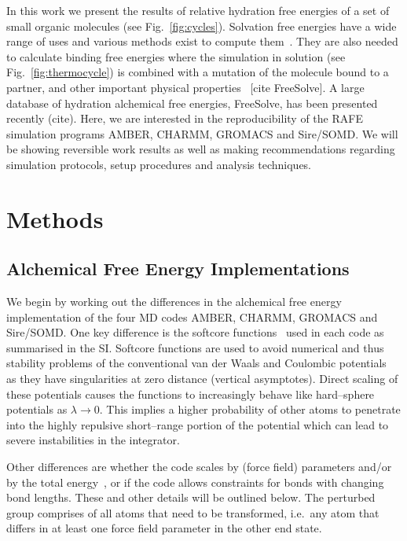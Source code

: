 \documentclass[journal=jctcce,manuscript=article]{achemso}
\begin{document}
In this work we present the results of relative hydration free
energies of a set of small organic molecules (see
Fig.~\ref{fig:cycles}).  Solvation free energies have a wide range of
uses and various methods exist to compute
them~\cite{Skyner:2015:PCCP}.  They are also needed to calculate
binding free energies where the simulation in solution (see
Fig.~\ref{fig:thermocycle}) is combined with a mutation of the
molecule bound to a partner, and other important physical
properties~\cite{Skyner:2015:PCCP} [cite FreeSolve].  A large database
of hydration alchemical free energies, FreeSolve, has been presented
recently (cite). Here, we are interested in the reproducibility of the
RAFE simulation programs AMBER, CHARMM, GROMACS and Sire/SOMD.  We
will be showing reversible work results as well as making
recommendations regarding simulation protocols, setup procedures and
analysis techniques.


\section{Methods}
\label{sec:methods}

\subsection{Alchemical Free Energy Implementations}
\label{sec:afe_impl}

We begin by working out the differences in the alchemical free energy
implementation of the four MD codes AMBER, CHARMM, GROMACS and
Sire/SOMD.  One key difference is the softcore
functions~\cite{beutler_avoiding_1994,
  zacharias_separationshifted_1994} used in each code as summarised in
the SI.  Softcore functions are used to avoid numerical and thus
stability problems of the conventional van der Waals and Coulombic
potentials~\cite{steinbrecher_nonlinear_2007} as they have
singularities at zero distance (vertical asymptotes).  Direct scaling
of these potentials causes the functions to increasingly behave like
hard--sphere potentials as $\lambda\rightarrow 0$.  This implies a
higher probability of other atoms to penetrate into the highly
repulsive short--range portion of the potential which can lead to
severe instabilities in the integrator.

Other differences are whether the code scales by (force field)
parameters and/or by the total energy~\cite{doi:10.1021/jp981628n}, or
if the code allows constraints for bonds with changing bond lengths.
These and other details will be outlined below.  The perturbed group
comprises of all atoms that need to be transformed, i.e.\ any atom
that differs in at least one force field parameter in the other end
state.
\end{document}
